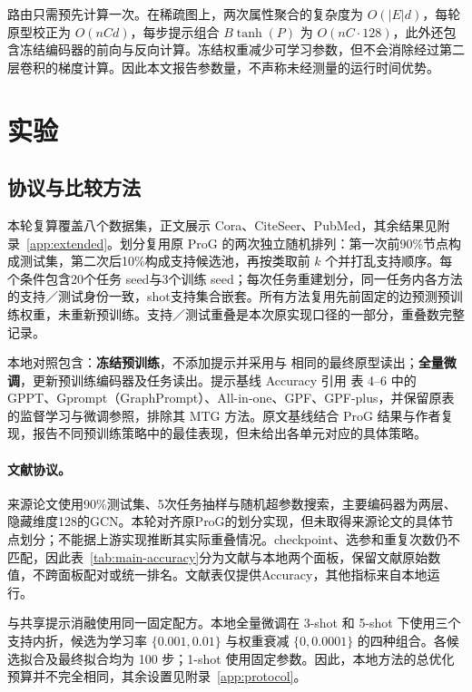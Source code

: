 路由只需预先计算一次。在稀疏图上，两次属性聚合的复杂度为 $O(|E|d)$，每轮原型校正为 $O(nCd)$，每步提示组合 $B\tanh(P)$ 为 $O(nC\cdot128)$，此外还包含冻结编码器的前向与反向计算。冻结权重减少可学习参数，但不会消除经过第二层卷积的梯度计算。因此本文报告参数量，不声称未经测量的运行时间优势。

\section{实验}
\subsection{协议与比较方法}
\label{sec:protocol}



本轮复算覆盖八个数据集，正文展示 Cora、CiteSeer、PubMed，其余结果见附录~\ref{app:extended}。划分复用原 ProG 的两次独立随机排列：第一次前90\%节点构成测试集，第二次后10\%构成支持候选池，再按类取前 $k$ 个并打乱支持顺序。每个条件包含20个任务 seed与3个训练 seed；每次任务重建划分，同一任务内各方法的支持／测试身份一致，shot支持集合嵌套。所有方法复用先前固定的边预测预训练权重，未重新预训练。支持／测试重叠是本次原实现口径的一部分，重叠数完整记录。

本地对照包含：\textbf{冻结预训练}，不添加提示并采用与 \method 相同的最终原型读出；\textbf{全量微调}，更新预训练编码器及任务读出。提示基线 Accuracy 引用 \citet{mtg2026} 表 4--6 中的 GPPT、Gprompt（GraphPrompt）、All-in-one、GPF、GPF-plus，并保留原表的监督学习与微调参照，排除其 MTG 方法。原文基线结合 ProG 结果与作者复现，报告不同预训练策略中的最佳表现，但未给出各单元对应的具体策略。

\paragraph{文献协议。}
来源论文使用90\%测试集、5次任务抽样与随机超参数搜索，主要编码器为两层、隐藏维度128的GCN。本轮对齐原ProG的划分实现，但未取得来源论文的具体节点划分；不能据上游实现推断其实际重叠情况。checkpoint、选参和重复次数仍不匹配，因此表~\ref{tab:main-accuracy}分为文献与本地两个面板，保留文献原始数值，不跨面板配对或统一排名。文献表仅提供Accuracy，其他指标来自本地运行。

\method 与共享提示消融使用同一固定配方。本地全量微调在 3-shot 和 5-shot 下使用三个支持内折，候选为学习率 $\{0.001,0.01\}$ 与权重衰减 $\{0,0.0001\}$ 的四种组合。各候选拟合及最终拟合均为 100 步；1-shot 使用固定参数。因此，本地方法的总优化预算并不完全相同，其余设置见附录~\ref{app:protocol}。

